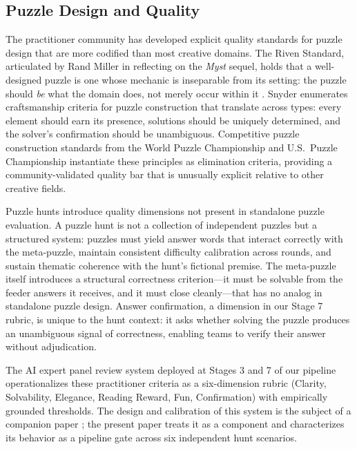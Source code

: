 \subsection{Puzzle Design and Quality}

The practitioner community has developed explicit quality standards for puzzle design that
are more codified than most creative domains. The Riven Standard, articulated by Rand Miller
in reflecting on the \emph{Myst} sequel, holds that a well-designed puzzle is one whose
mechanic is inseparable from its setting: the puzzle should \emph{be} what the domain does,
not merely occur within it \cite{miller2016riven}. Snyder \cite{snyder2019craftsmanship}
enumerates craftsmanship criteria for puzzle construction that translate across types: every
element should earn its presence, solutions should be uniquely determined, and the solver's
confirmation should be unambiguous. Competitive puzzle construction standards from the World
Puzzle Championship and U.S.\ Puzzle Championship instantiate these principles as
elimination criteria, providing a community-validated quality bar that is unusually explicit
relative to other creative fields.

Puzzle hunts introduce quality dimensions not present in standalone puzzle evaluation. A
puzzle hunt is not a collection of independent puzzles but a structured system: puzzles must
yield answer words that interact correctly with the meta-puzzle, maintain consistent
difficulty calibration across rounds, and sustain thematic coherence with the hunt's
fictional premise. The meta-puzzle itself introduces a structural correctness criterion---it
must be solvable from the feeder answers it receives, and it must close cleanly---that has
no analog in standalone puzzle design. Answer confirmation, a dimension in our Stage 7
rubric, is unique to the hunt context: it asks whether solving the puzzle produces an
unambiguous signal of correctness, enabling teams to verify their answer without
adjudication.

The AI expert panel review system deployed at Stages 3 and 7 of our pipeline operationalizes
these practitioner criteria as a six-dimension rubric (Clarity, Solvability, Elegance,
Reading Reward, Fun, Confirmation) with empirically grounded thresholds. The design and
calibration of this system is the subject of a companion paper
\cite{dellaLibera2025panel}; the present paper treats it as a component and characterizes
its behavior as a pipeline gate across six independent hunt scenarios.

